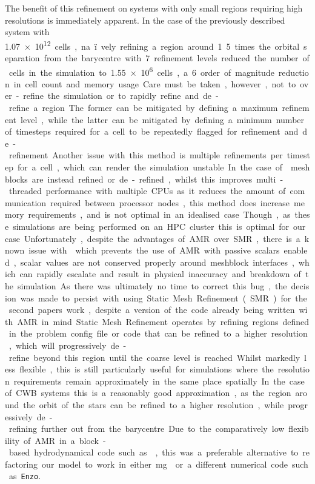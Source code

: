 The benefit of this refinement on systems with only small regions requiring high resolutions is immediately apparent.
In the case of the previously described system with \SI{1.07e12} cells, na\"ively refining a region around 1.5 times the orbital separation from the barycentre with 7 refinement levels reduced the number of cells in the simulation to \num{1.55e6} cells, a 6 order of magnitude reduction in cell count and memory usage.
Care must be taken, however, not to over-refine the simulation or to rapidly refine and de-refine a region.
The former can be mitigated by defining a maximum refinement level, while the latter can be mitigated by defining a minimum number of timesteps required for a cell to be repeatedly flagged for refinement and de-refinement.
Another issue with this method is multiple refinements per timestep for a cell, which can render the simulation unstable.

In the case of \athena{} meshblocks are instead refined or de-refined, whilst this improves multi-threaded performance with multiple CPUs as it reduces the amount of communication required between processor nodes, this method does increase memory requirements, and is not optimal in an idealised case.
Though, as these simulations are being performed on an HPC cluster this is optimal for our case.
Unfortunately, despite the advantages of AMR over SMR, there is a known issue with  which prevents the use of AMR with passive scalars enabled, scalar values are not conserved properly around meshblock interfaces, which can rapidly escalate and result in physical inaccuracy and breakdown of the simulation.
As there was ultimately no time to correct this bug, the decision was made to persist with using Static Mesh Refinement (SMR) for the second papers work, despite a version of the code already being written with AMR in mind.

Static Mesh Refinement operates by refining regions defined in the problem config file or code that can be refined to a higher resolution, which will progressively de-refine beyond this region until the coarse level is reached.
Whilst markedly less flexible, this is still particularly useful for simulations where the resolution requirements remain approximately in the same place spatially.
In the case of CWB systems this is a reasonably good approximation, as the region around the orbit of the stars can be refined to a higher resolution, while progressively de-refining further out from the barycentre.
Due to the comparatively low flexibility of AMR in a block-based hydrodynamical code such as \athena{}, this was a preferable alternative to refactoring our model to work in either \mg{} or a different numerical code such as \texttt{Enzo}.


